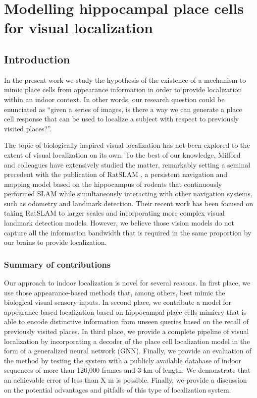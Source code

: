 \chapter{Modelling hippocampal place cells for visual localization}\label{ch:chapter5} %


\section{Introduction}

In the present work we study the hypothesis of the existence of a mechanism to mimic place cells from appearance information in order to provide localization within an indoor context. In other words, our research question could be enunciated as ``given a series of images, is there a way we can generate a place cell response that can be used to localize a subject with respect to previously visited places?''.

The topic of biologically inspired visual localization has not been explored to the extent of visual localization on its own. To the best of our knowledge, Milford and colleagues have extensively studied the matter, remarkably setting a seminal precedent with the publication of RatSLAM \cite{milford2004ratslam}, a persistent navigation and mapping model based on the hippocampus of rodents that continuously performed SLAM while simultaneously interacting with other navigation systems, such as odometry and landmark detection. Their recent work has been focused on taking RatSLAM to larger scales and incorporating more complex visual landmark detection models. However, we believe those vision models do not capture all the information bandwidth that is required in the same proportion by our brains to provide localization.

\subsection{Summary of contributions}

Our approach to indoor localization is novel for several reasons. In first place, we use those appearance-based methods that, among others, best mimic the biological visual sensory inputs. In second place, we contribute a model for appearance-based localization based on hippocampal place cells mimicry that is able to encode distinctive information from unseen queries based on the recall of previously visited places. In third place, we provide a complete pipeline of visual localization by incorporating a decoder of the place cell localization model in the form of a generalized neural network (GNN). Finally, we provide an evaluation of the method by testing the system with a publicly available database of indoor sequences of more than 120,000 frames and 3 km of length. We demonstrate that an achievable error of less than X m is possible. Finally, we provide a discussion on the potential advantages and pitfalls of this type of localization system.



